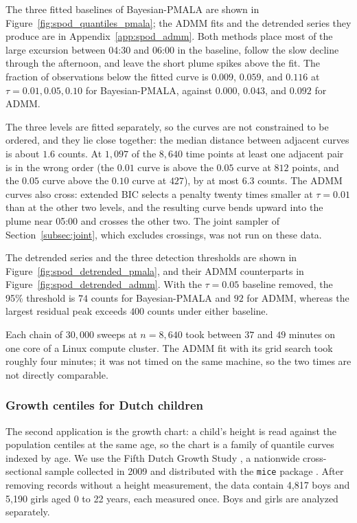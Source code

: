 The three fitted baselines of Bayesian-PMALA are shown in Figure~\ref{fig:spod_quantiles_pmala}; the ADMM fits and the detrended series they produce are in Appendix~\ref{app:spod_admm}. Both methods place most of the large excursion between 04:30 and 06:00 in the baseline, follow the slow decline through the afternoon, and leave the short plume spikes above the fit. The fraction of observations below the fitted curve is $0.009$, $0.059$, and $0.116$ at $\tau = 0.01, 0.05, 0.10$ for Bayesian-PMALA, against $0.000$, $0.043$, and $0.092$ for ADMM.

The three levels are fitted separately, so the curves are not constrained to be ordered, and they lie close together: the median distance between adjacent curves is about $1.6$ counts. At $1{,}097$ of the $8{,}640$ time points at least one adjacent pair is in the wrong order (the $0.01$ curve is above the $0.05$ curve at $812$ points, and the $0.05$ curve above the $0.10$ curve at $427$), by at most $6.3$ counts. The ADMM curves also cross: extended BIC selects a penalty twenty times smaller at $\tau = 0.01$ than at the other two levels, and the resulting curve bends upward into the plume near 05:00 and crosses the other two. The joint sampler of Section~\ref{subsec:joint}, which excludes crossings, was not run on these data.

The detrended series and the three detection thresholds are shown in Figure~\ref{fig:spod_detrended_pmala}, and their ADMM counterparts in Figure~\ref{fig:spod_detrended_admm}. With the $\tau = 0.05$ baseline removed, the 95\% threshold is $74$ counts for Bayesian-PMALA and $92$ for ADMM, whereas the largest residual peak exceeds $400$ counts under either baseline.

Each chain of $30{,}000$ sweeps at $n = 8{,}640$ took between $37$ and $49$ minutes on one core of a Linux compute cluster. The ADMM fit with its grid search took roughly four minutes; it was not timed on the same machine, so the two times are not directly comparable.

\subsubsection{Growth centiles for Dutch children}
\label{sec:app:growth}

The second application is the growth chart: a child's height is read against the population centiles at the same age, so the chart is a family of quantile curves indexed by age. We use the Fifth Dutch Growth Study \citep{schonbeck2013tallest}, a nationwide cross-sectional sample collected in 2009 and distributed with the \texttt{mice} package \citep{vanbuuren2011mice}. After removing records without a height measurement, the data contain 4{,}817 boys and 5{,}190 girls aged 0 to 22 years, each measured once. Boys and girls are analyzed separately.

